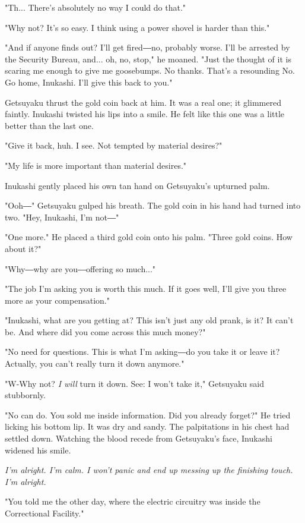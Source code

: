 "Th... There's absolutely no way I could do that."

"Why not? It's so easy. I think using a power shovel is harder than
this."

"And if anyone finds out? I'll get fired―no, probably worse. I'll be
arrested by the Security Bureau, and... oh, no, stop," he moaned. "Just
the thought of it is scaring me enough to give me goosebumps. No thanks.
That's a resounding No. Go home, Inukashi. I'll give this back to you."

Getsuyaku thrust the gold coin back at him. It was a real one; it
glimmered faintly. Inukashi twisted his lips into a smile. He felt like
this one was a little better than the last one.

"Give it back, huh. I see. Not tempted by material desires?"

"My life is more important than material desires."

Inukashi gently placed his own tan hand on Getsuyaku's upturned palm.

"Ooh―" Getsuyaku gulped his breath. The gold coin in his hand had turned
into two. "Hey, Inukashi, I'm not―"

"One more." He placed a third gold coin onto his palm. "Three gold
coins. How about it?"

"Why―why are you―offering so much..."

"The job I'm asking you is worth this much. If it goes well, I'll give
you three more as your compensation."

"Inukashi, what are you getting at? This isn't just any old prank, is
it? It can't be. And where did you come across this much money?"

"No need for questions. This is what I'm asking―do you take it or leave
it? Actually, you can't really turn it down anymore."

"W-Why not? \emph{I will} turn it down. See: I won't take it," Getsuyaku said
stubbornly.

"No can do. You sold me inside information. Did you already forget?" He
tried licking his bottom lip. It was dry and sandy. The palpitations in
his chest had settled down. Watching the blood recede from Getsuyaku's
face, Inukashi widened his smile.

\emph{I'm alright. I'm calm. I won't panic and end up messing up the finishing
touch. I'm alright.}

"You told me the other day, where the electric circuitry was inside the
Correctional Facility."

